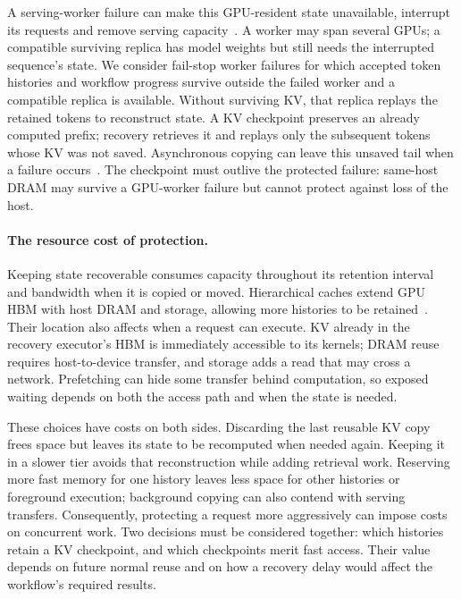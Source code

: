 A serving-worker failure can make this GPU-resident state unavailable,
interrupt its requests and remove serving capacity~\cite{cao2026lumen}.
A worker may span several GPUs; a compatible surviving replica has model
weights but still needs the interrupted sequence's state. We consider
fail-stop worker failures for which accepted token histories and workflow
progress survive outside the failed worker and a compatible replica is
available. Without surviving KV, that replica replays the retained tokens
to reconstruct state. A KV checkpoint preserves an already computed
prefix; recovery retrieves it and replays only the subsequent tokens
whose KV was not saved. Asynchronous copying can leave this unsaved tail
when a failure occurs~\cite{strati2024dejavu,jayakody2026ghostserve}.
The checkpoint must outlive the protected failure: same-host DRAM may
survive a GPU-worker failure but cannot protect against loss of the host.

\paragraph{The resource cost of protection.}
Keeping state recoverable consumes capacity throughout its retention
interval and bandwidth when it is copied or moved. Hierarchical caches
extend GPU HBM with host DRAM and storage, allowing more histories to be
retained~\cite{qin2025mooncake,gao2024cachedattention}. Their location
also affects when a request can execute. KV already in the recovery
executor's HBM is immediately accessible to its kernels; DRAM reuse
requires host-to-device transfer, and storage adds a read that may cross
a network. Prefetching can hide some transfer behind computation, so
exposed waiting depends on both the access path and when the state is
needed.

These choices have costs on both sides. Discarding the last reusable KV
copy frees space but leaves its state to be recomputed when needed again. Keeping
it in a slower tier avoids that reconstruction while adding retrieval
work. Reserving more fast memory for one history leaves less space for
other histories or foreground execution; background copying can also
contend with serving transfers. Consequently, protecting a request more
aggressively can impose costs on concurrent work. Two decisions must be
considered together: which histories retain a KV checkpoint, and which
checkpoints merit fast access. Their value depends on future normal reuse and on how a
recovery delay would affect the workflow's required results.


